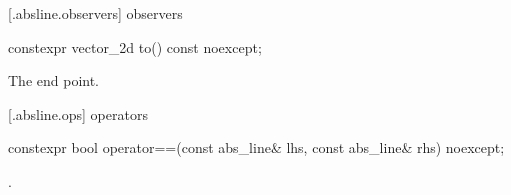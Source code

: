  [\iotwod.absline.observers]{ observers}

%
\begin{itemdecl}
constexpr vector_2d to() const noexcept;
\end{itemdecl}
\begin{itemdescr}
\pnum
\returns
The end point.
\end{itemdescr}

 [\iotwod.absline.ops]{ operators}

%
\begin{itemdecl}
constexpr bool operator==(const abs_line& lhs, const abs_line& rhs) noexcept;
\end{itemdecl}
\begin{itemdescr}
\pnum
\returns
{}.
\end{itemdescr}
